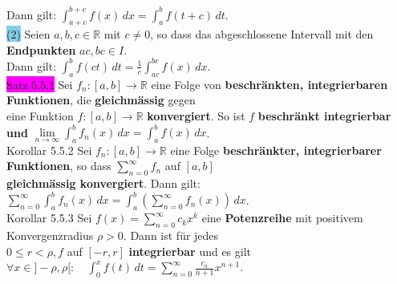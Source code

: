 \documentclass[10pt]{article}
\begin{document}
        \indent\indent Dann gilt: 
                \textcolor{NavyBlue}{$\int_{a+c}^{b+c}f(x)\,dx=\int_a^bf(t+c)\,dt$}.\\
        \indent \colorbox{SkyBlue}{(2)} Seien \textcolor{NavyBlue}{$a,b,c\in\mathbb{R}$} mit 
                \textcolor{NavyBlue}{$c\neq0$}, so dass das abgeschlossene Intervall mit den 
                \textbf{Endpunkten} \textcolor{NavyBlue}{$ac,bc\in I$}. \\
        \indent\indent Dann gilt: 
                \textcolor{NavyBlue}{$\int_a^bf(ct)\,dt=\frac{1}{c}\int_{ac}^{bc}f(x)\,dx$}.\\
\colorbox{magenta}{Satz 5.5.1} Sei \textcolor{NavyBlue}{$f_n:[a,b]\longrightarrow\mathbb{R}$} 
                eine Folge von \textbf{beschränkten, integrierbaren Funktionen}, 
                die \textbf{gleichmässig} gegen \\
        \indent eine Funktion 
                \textcolor{NavyBlue}{$f:[a,b]\longrightarrow\mathbb{R}$} \textbf{konvergiert}.
                So ist \textcolor{NavyBlue}{$f$} \textbf{beschränkt integrierbar und} 
                \textcolor{NavyBlue}{$\lim\limits_{n\to\infty}\int_a^bf_n(x)\,dx
                =\int_a^bf(x)\,dx$}.\\
\colorbox{BurntOrange}{Korollar 5.5.2} Sei 
                \textcolor{NavyBlue}{$f_n:[a,b]\longrightarrow\mathbb{R}$} eine Folge 
                \textbf{beschränkter, integrierbarer Funktionen}, so dass 
                \textcolor{NavyBlue}{$\sum_{n=0}^\infty f_n$} auf 
                \textcolor{NavyBlue}{$[a,b]$}\\
        \indent \textbf{gleichmässig konvergiert}. Dann gilt: 
                \textcolor{NavyBlue}{$\sum_{n=0}^\infty\int_a^bf_n(x)\,dx
                =\int_a^b(\sum_{n=0}^\infty f_n(x))\,dx$}. \\
\colorbox{BurntOrange}{Korollar 5.5.3} Sei 
                \textcolor{NavyBlue}{$f(x)=\sum_{n=0}^\infty c_kx^k$} 
                eine \textbf{Potenzreihe} mit positivem Konvergenzradius 
                \textcolor{NavyBlue}{$\rho>0$}. Dann ist für jedes \\
        \indent \textcolor{NavyBlue}{$0\leqslant r<\rho$},\,\textcolor{NavyBlue}{$f$} 
                auf \textcolor{NavyBlue}{$[-r,r]$}
                \textbf{integrierbar} und es gilt 
                \textcolor{NavyBlue}{$\forall x\in]-\rho,\rho[:\quad
                \int_0^xf(t)\,dt=\sum_{n=0}^\infty\frac{c_n}{n+1}x^{n+1}$}.\\
\end{document}
